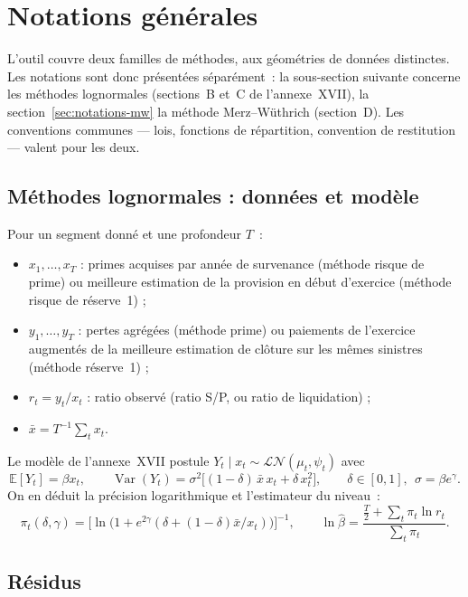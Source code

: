 \documentclass[a4paper,11pt]{article}
\begin{document}
\newpage
\clearpage
\section{Notations générales}

L'outil couvre deux familles de méthodes, aux géométries de données distinctes.
Les notations sont donc présentées séparément~: la sous-section suivante concerne
les méthodes lognormales (sections~B et~C de l'annexe~XVII), la
section~\ref{sec:notations-mw} la méthode Merz--Wüthrich (section~D). Les
conventions communes --- lois, fonctions de répartition, convention de
restitution --- valent pour les deux.

\subsection*{Méthodes lognormales : données et modèle}

Pour un segment donné et une profondeur $T$~:
\begin{itemize}[itemsep=1pt]
  \item $x_1,\dots,x_T$ : primes acquises par année de survenance (méthode risque de prime) ou
        meilleure estimation de la provision en début d'exercice (méthode risque de réserve~1) ;
  \item $y_1,\dots,y_T$ : pertes agrégées (méthode prime) ou paiements de l'exercice augmentés de
        la meilleure estimation de clôture sur les mêmes sinistres (méthode réserve~1) ;
  \item $r_t = y_t / x_t$ : ratio observé (ratio S/P, ou ratio de liquidation) ;
  \item $\bar x = T^{-1}\sum_t x_t$.
\end{itemize}

Le modèle de l'annexe~XVII postule $Y_t \mid x_t \sim \mathcal{LN}(\mu_t,\psi_t)$ avec
\[
  \mathbb{E}[Y_t] = \beta x_t,
  \qquad
  \operatorname{Var}(Y_t) = \sigma^2\big[(1-\delta)\,\bar x\, x_t + \delta\, x_t^2\big],
  \qquad \delta\in[0,1],\ \ \sigma = \beta e^{\gamma}.
\]
On en déduit la précision logarithmique et l'estimateur du niveau~:
\[
  \pi_t(\delta,\gamma) = \Big[\ln\!\big(1 + e^{2\gamma}(\delta + (1-\delta)\bar x / x_t)\big)\Big]^{-1},
  \qquad
  \ln\hat\beta = \frac{\tfrac{T}{2} + \sum_t \pi_t \ln r_t}{\sum_t \pi_t}.
\]

\subsection*{Résidus}
\end{document}
